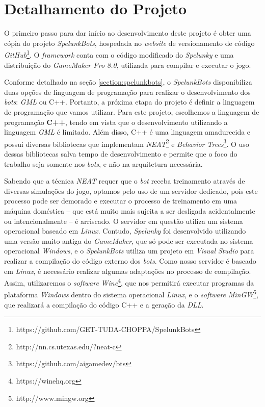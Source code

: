 \section{\label{section:project-details}Detalhamento do Projeto}
O primeiro passo para dar início ao desenvolvimento deste projeto é obter uma
cópia do projeto \textit{SpelunkBots}, hospedada no \textit{website} de
versionamento de código
\textit{GitHub}\footnote{https://github.com/GET-TUDA-CHOPPA/SpelunkBots}. O
\textit{framework} conta com o código modificado do \textit{Spelunky} e uma
distribuição do \textit{GameMaker Pro 8.0}, utilizada para compilar e executar o
jogo.

Conforme detalhado na seção \ref{section:spelunkbots}, o \textit{SpelunkBots}
disponibiliza duas opções de linguagem de programação para realizar o
desenvolvimento dos \textit{bots}: \textit{GML} ou C++. Portanto, a próxima
etapa do projeto é definir a linguagem de programação que vamos utilizar. Para
este projeto, escolhemos a linguagem de programação \textbf{C++}, tendo em vista
que o desenvolvimento utilizando a linguagem \textit{GML} é limitado. Além
disso, C++ é uma linguagem amadurecida e possui diversas bibliotecas que implementam
\textit{NEAT}\footnote{http://nn.cs.utexas.edu/?neat-c} e \textit{Behavior
Trees}\footnote{https://github.com/aigamedev/bts}. O uso dessas bibliotecas
salva tempo de desenvolvimento e permite que o foco do trabalho seja somente nos
\textit{bots}, e não na arquitetura necessária.

Sabendo que a técnica \textit{NEAT} requer que o \textit{bot} receba treinamento
através de diversas simulações do jogo, optamos pelo uso de um servidor
dedicado, pois este processo pode ser demorado e executar o processo de
treinamento em uma máquina doméstica -- que está muito mais sujeita a ser
desligada acidentalmente ou intencionalmente -- é arriscado. O servidor em
questão utiliza um sistema operacional baseado em \textit{Linux}.  Contudo,
\textit{Spelunky} foi desenvolvido utilizando uma versão muito antiga do
\textit{GameMaker}, que só pode ser executada no sistema operacional
\textit{Windows}, e o \textit{SpelunkBots} utiliza um projeto em \textit{Visual
Studio} para realizar a compilação do código externo dos \textit{bots}. Como
nosso servidor é baseado em \textit{Linux}, é necessário realizar algumas
adaptações no processo de compilação. Assim, utilizaremos o \textit{software}
\textit{Wine}\footnote{https://winehq.org}, que nos permitirá executar programas
da plataforma \textit{Windows} dentro do sistema operacional \textit{Linux}, e o
\textit{software} \textit{MinGW}\footnote{http://www.mingw.org}, que realizará a
compilação do código C++ e a geração da \textit{DLL}.


